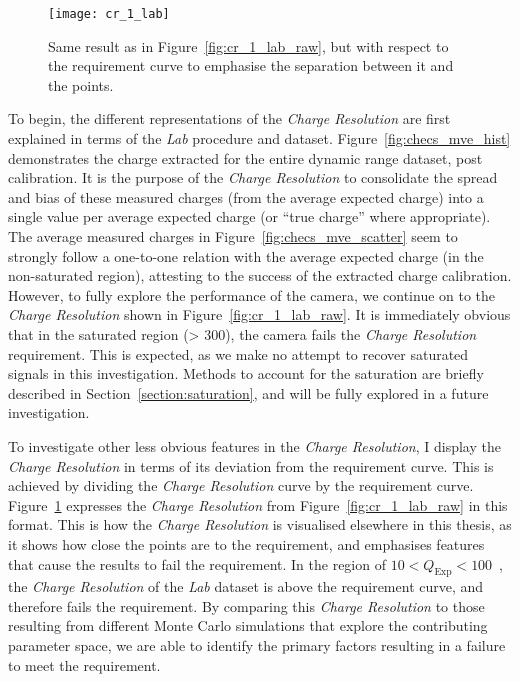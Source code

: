 \begin{figure}
	\centering
    \texttt{[image: cr\_1\_lab]} 
	\caption[\textit{Charge Resolution} of the Lab dataset with respect to the requirement.]{Same result as in Figure~\ref{fig:cr_1_lab_raw}, but with respect to the requirement curve to emphasise the separation between it and the points.}
	\label{fig:cr_1_lab}
\end{figure}

To begin, the different representations of the \textit{Charge Resolution} are first explained in terms of the \textit{Lab} procedure and dataset. Figure~\ref{fig:checs_mve_hist} demonstrates the charge extracted for the entire dynamic range dataset, post calibration. It is the purpose of the \textit{Charge Resolution} to consolidate the spread and bias of these measured charges (from the average expected charge) into a single value per average expected charge (or ``true charge'' where appropriate). The average measured charges in Figure~\ref{fig:checs_mve_scatter} seem to strongly follow a one-to-one relation with the average expected charge (in the non-saturated region), attesting to the success of the extracted charge calibration. However, to fully explore the performance of the camera, we continue on to the \textit{Charge Resolution} shown in Figure~\ref{fig:cr_1_lab_raw}. It is immediately obvious that in the saturated region (\SI{> 300}{\pe}), the camera fails the \textit{Charge Resolution} requirement. This is expected, as we make no attempt to recover saturated signals in this investigation. Methods to account for the saturation are briefly described in Section~\ref{section:saturation}, and will be fully explored in a future investigation. 

To investigate other less obvious features in the \textit{Charge Resolution}, I display the \textit{Charge Resolution} in terms of its deviation from the requirement curve. This is achieved by dividing the \textit{Charge Resolution} curve by the requirement curve. Figure~\ref{fig:cr_1_lab} expresses the \textit{Charge Resolution} from Figure~\ref{fig:cr_1_lab_raw} in this format. This is how the \textit{Charge Resolution} is visualised elsewhere in this thesis, as it shows how close the points are to the requirement, and emphasises features that cause the results to fail the requirement. In the region of $10 < Q_\text{Exp} < 100$~\si{\pe}, the \textit{Charge Resolution} of the \textit{Lab} dataset is above the requirement curve, and therefore fails the requirement. By comparing this \textit{Charge Resolution} to those resulting from different Monte Carlo simulations that explore the contributing parameter space, we are able to identify the primary factors resulting in a failure to meet the requirement.

